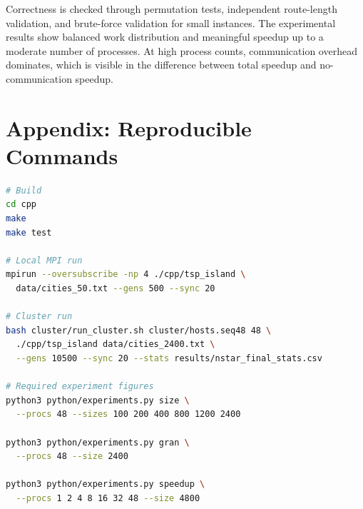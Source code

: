 \documentclass[11pt,a4paper]{article}
\begin{document}
Correctness is checked through permutation tests, independent route-length
validation, and brute-force validation for small instances. The experimental
results show balanced work distribution and meaningful speedup up to a moderate
number of processes. At high process counts, communication overhead dominates,
which is visible in the difference between total speedup and no-communication
speedup.

\section*{Appendix: Reproducible Commands}

\begin{lstlisting}[language=bash]
# Build
cd cpp
make
make test

# Local MPI run
mpirun --oversubscribe -np 4 ./cpp/tsp_island \
  data/cities_50.txt --gens 500 --sync 20

# Cluster run
bash cluster/run_cluster.sh cluster/hosts.seq48 48 \
  ./cpp/tsp_island data/cities_2400.txt \
  --gens 10500 --sync 20 --stats results/nstar_final_stats.csv

# Required experiment figures
python3 python/experiments.py size \
  --procs 48 --sizes 100 200 400 800 1200 2400

python3 python/experiments.py gran \
  --procs 48 --size 2400

python3 python/experiments.py speedup \
  --procs 1 2 4 8 16 32 48 --size 4800
\end{lstlisting}
\end{document}
